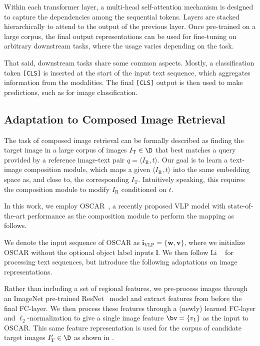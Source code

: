 \documentclass[10pt,twocolumn,letterpaper]{article}
\makeatletter
\renewcommand{\paragraph}{\@startsection{paragraph}{4}{\z@}{1.05ex \@plus 1ex \@minus .2ex}{-1em}{\normalfont\normalsize\bfseries}}
\makeatother
\begin{document}
Within each transformer layer, a multi-head self-attention mechanism is designed to capture the dependencies among the sequential tokens. Layers are stacked hierarchically to attend to the output of the previous layer. Once pre-trained on a large corpus, the final output representations can be used for fine-tuning on arbitrary downstream tasks, where the usage varies depending on the task.

That said, downstream tasks share some common aspects.
Mostly, a classification token \texttt{[CLS]} is inserted at the start of the input text sequence, which aggregates information from the modalities. The final \texttt{[CLS]} output is then used to make predictions, such as for image classification.

\subsection{Adaptation to Composed Image Retrieval}
The task of composed image retrieval can be formally described as finding the target image in a large corpus of images $I_{\text{T}} \in \D$ that best matches a query provided by a reference image-text pair $q = \langle I_{\text{R}}, t\rangle$. 
Our goal is to learn a text-image composition module, which maps a given $\langle I_{\text{R}}, t\rangle$ into the same embedding space as, and close to, the corresponding $I_{\text{T}}$. Intuitively speaking, this requires the composition module to modify $I_{\text{R}}$ conditioned on $t$.

In this work, we employ OSCAR~\cite{oscar}, a recently proposed VLP model with state-of-the-art performance as the composition module to perform the mapping as follows. 

\paragraph{Input sequence.}
We denote the input sequence of OSCAR as $\boldsymbol{i}_{\text{VLP}}=\{\boldsymbol{w},\boldsymbol{v}\}$, where we initialize OSCAR without the optional object label inputs $\boldsymbol{l}$. We then follow Li \etal~\cite{oscar} for processing text sequences, but introduce the following adaptations on image representations.

Rather than including a set of regional features, we pre-process images through an ImageNet pre-trained ResNet~\cite{he2015deep} model and extract features from before the final FC-layer. We then process these features through a (newly) learned FC-layer and $\ell_2$-normalization to give a single image feature $\bv = \{v_1\}$ as the input to OSCAR. This same feature representation is used for the corpus of candidate target images $I'_{\text{T}} \in \D$ as shown in .
\end{document}
